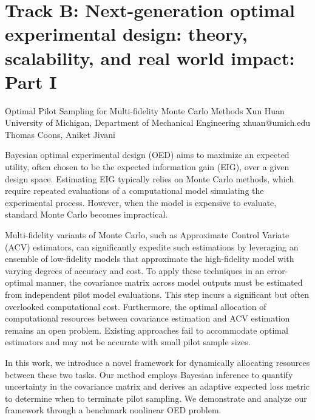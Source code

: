 \section{Track B: Next-generation optimal experimental design: theory, scalability, and real world impact: Part I}\newpage

\begin{talk}
  {Optimal Pilot Sampling for Multi-fidelity Monte Carlo Methods}%
  {Xun Huan}%
  {University of Michigan, Department of Mechanical Engineering}%
  {xhuan@umich.edu}%
  {Thomas Coons, Aniket Jivani}%
  
    

Bayesian optimal experimental design (OED) aims to maximize an expected utility, often chosen to be the expected information gain (EIG), over a given design space. Estimating EIG typically relies on Monte Carlo methods, which require repeated evaluations of a computational model simulating the experimental process. 
However, when the model is expensive to evaluate, standard Monte Carlo becomes impractical.

Multi-fidelity variants of Monte Carlo, such as Approximate Control Variate (ACV) estimators, can significantly expedite such estimations by leveraging an ensemble of low-fidelity models that approximate the high-fidelity model with varying degrees of accuracy and cost. 
To apply these techniques in an error-optimal manner, the covariance matrix across model outputs must be estimated from independent pilot model evaluations. This step incurs a significant but often overlooked computational cost. 
Furthermore, the optimal allocation of computational resources between 
covariance estimation and 
ACV estimation remains an open problem.  Existing approaches fail to accommodate optimal estimators and may not be accurate with small pilot sample sizes.

In this work, we introduce a novel framework for dynamically allocating resources between these two tasks.
Our method employs Bayesian inference
to quantify uncertainty in the covariance matrix and derives an adaptive expected loss metric
to determine when to terminate pilot sampling. 
We demonstrate and analyze our framework through a benchmark nonlinear OED problem. 


\end{talk}

